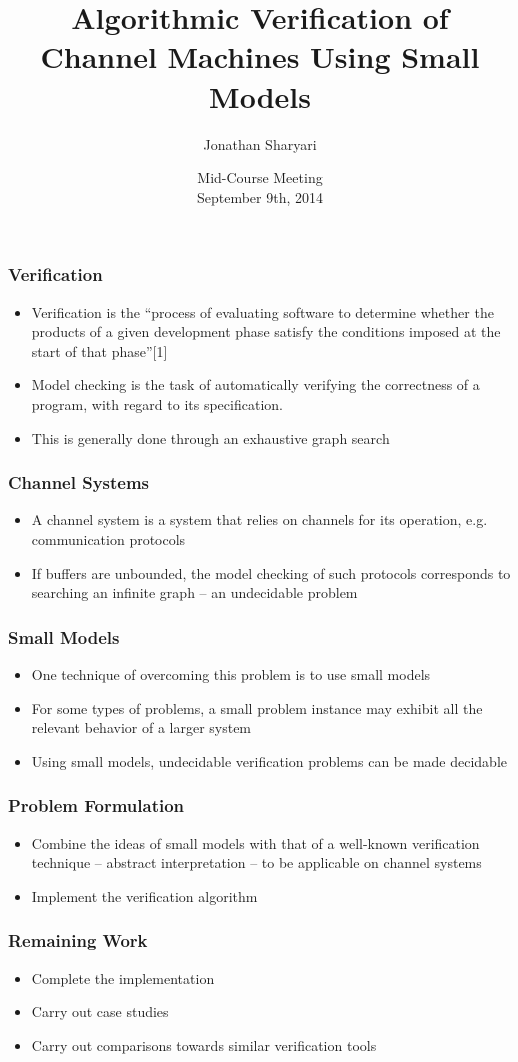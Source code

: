 \documentclass{beamer}
\title[Crisis] %
{Algorithmic Verification of Channel Machines Using Small Models}
\author[J, Sharyari] {Jonathan Sharyari}
\date{Mid-Course Meeting \\ September 9th, 2014}
\begin{document}
\frame{\titlepage}

  \begin{frame}
    \frametitle{Verification}
    \begin{itemize}
      \item
        Verification is the “process of evaluating software to determine whether the products of a given development phase satisfy the conditions imposed at the start of that phase”[1]
      \item
        Model checking is the task of automatically verifying the correctness of a program, with regard to its specification.
      \item
        This is generally done through an exhaustive graph search
    \end{itemize}
  \end{frame}
  \begin{frame}
    \frametitle{Channel Systems}
    \begin{itemize}
      \item
        A channel system is a system that relies on channels for its operation, e.g. communication protocols
      \item
        If buffers are unbounded, the model checking of such protocols corresponds to searching an infinite graph – an undecidable problem 
    \end{itemize}
  \end{frame}
  \begin{frame}
    \frametitle{Small Models}
    \begin{itemize}
      \item
        One technique of overcoming this problem is to use small models
      \item
        For some types of problems, a small problem instance may exhibit all the relevant behavior of a larger system
      \item
        Using small models, undecidable verification problems can be made decidable
    \end{itemize}
  \end{frame}
  \begin{frame}
    \frametitle{Problem Formulation}
    \begin{itemize}
      \item
        Combine the ideas of small models with that of a well-known verification technique – abstract interpretation – to be applicable on channel systems
      \item
        Implement the verification algorithm
    \end{itemize}
  \end{frame}
  \begin{frame}
    \frametitle{Remaining Work}
    \begin{itemize}
      \item
        Complete the implementation
      \item
        Carry out case studies
      \item
        Carry out comparisons towards similar verification tools
    \end{itemize}
  \end{frame}
\end{document}
